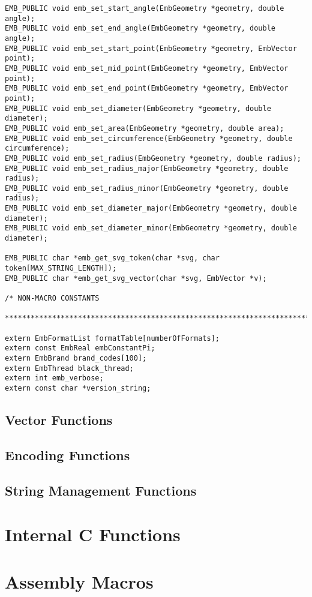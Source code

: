\begin{verbatim}
EMB_PUBLIC void emb_set_start_angle(EmbGeometry *geometry, double angle);
EMB_PUBLIC void emb_set_end_angle(EmbGeometry *geometry, double angle);
EMB_PUBLIC void emb_set_start_point(EmbGeometry *geometry, EmbVector point);
EMB_PUBLIC void emb_set_mid_point(EmbGeometry *geometry, EmbVector point);
EMB_PUBLIC void emb_set_end_point(EmbGeometry *geometry, EmbVector point);
EMB_PUBLIC void emb_set_diameter(EmbGeometry *geometry, double diameter);
EMB_PUBLIC void emb_set_area(EmbGeometry *geometry, double area);
EMB_PUBLIC void emb_set_circumference(EmbGeometry *geometry, double circumference);
EMB_PUBLIC void emb_set_radius(EmbGeometry *geometry, double radius);
EMB_PUBLIC void emb_set_radius_major(EmbGeometry *geometry, double radius);
EMB_PUBLIC void emb_set_radius_minor(EmbGeometry *geometry, double radius);
EMB_PUBLIC void emb_set_diameter_major(EmbGeometry *geometry, double diameter);
EMB_PUBLIC void emb_set_diameter_minor(EmbGeometry *geometry, double diameter);

EMB_PUBLIC char *emb_get_svg_token(char *svg, char token[MAX_STRING_LENGTH]);
EMB_PUBLIC char *emb_get_svg_vector(char *svg, EmbVector *v);

/* NON-MACRO CONSTANTS
 ******************************************************************************/

extern EmbFormatList formatTable[numberOfFormats];
extern const EmbReal embConstantPi;
extern EmbBrand brand_codes[100];
extern EmbThread black_thread;
extern int emb_verbose;
extern const char *version_string;
\end{verbatim}

\subsection{Vector Functions}

\subsection{Encoding Functions}

\subsection{String Management Functions}

\section{Internal C Functions}

\section{Assembly Macros}

